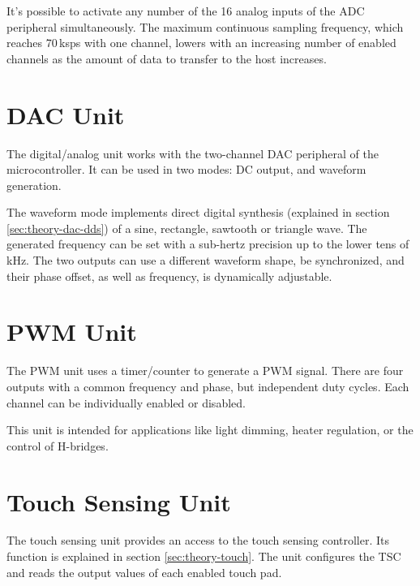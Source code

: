 It's possible to activate any number of the 16 analog inputs of the ADC peripheral simultaneously. The maximum continuous sampling frequency, which reaches 70\,ksps with one channel, lowers with an increasing number of enabled channels as the amount of data to transfer to the host increases.


\section{DAC Unit}

The digital/analog unit works with the two-channel DAC peripheral of the microcontroller. It can be used in two modes: DC output, and waveform generation.

The waveform mode implements direct digital synthesis (explained in section \ref{sec:theory-dac-dds}) of a sine, rectangle, sawtooth or triangle wave. The generated frequency can be set with a sub-hertz precision up to the lower tens of kHz. The two outputs can use a different waveform shape, be synchronized, and their phase offset, as well as frequency, is dynamically adjustable.


\section{PWM Unit}

The PWM unit uses a timer/counter to generate a PWM signal. There are four outputs with a common frequency and phase, but independent duty cycles. Each channel can be individually enabled or disabled.

This unit is intended for applications like light dimming, heater regulation, or the control of H-bridges.


\section{Touch Sensing Unit}

The touch sensing unit provides an access to the touch sensing controller. Its function is explained in section \ref{sec:theory-touch}. The unit configures the TSC and reads the output values of each enabled touch pad.






